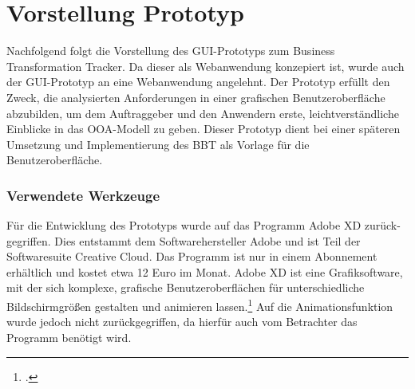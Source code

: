\section{Vorstellung Prototyp}
Nachfolgend folgt die Vorstellung des GUI-Prototyps zum Business Transformation Tracker. Da dieser als Webanwendung konzepiert ist, wurde auch der GUI-Prototyp an eine Webanwendung angelehnt. Der Prototyp erfüllt den Zweck, die analysierten Anforderungen in einer grafischen Benutzeroberfläche abzubilden, um dem Auftraggeber und den Anwendern erste, leichtverständliche Einblicke in das OOA-Modell zu geben. Dieser Prototyp dient bei einer späteren Umsetzung und Implementierung des BBT als Vorlage für die Benutzeroberfläche.

\subsubsection{Verwendete Werkzeuge}
Für die Entwicklung des Prototyps wurde auf das Programm Adobe XD zurück-gegriffen. Dies entstammt dem Softwarehersteller Adobe und ist Teil der Softwaresuite \glqq{}Creative Cloud\grqq{}. Das Programm ist nur in einem Abonnement erhältlich und kostet etwa 12 Euro im Monat. Adobe XD ist eine Grafiksoftware, mit der sich komplexe, grafische Benutzeroberflächen für unterschiedliche Bildschirmgrößen gestalten und animieren lassen.\footcite[Vgl.][]{adobe} Auf die Animationsfunktion wurde jedoch nicht zurückgegriffen, da hierfür auch vom Betrachter das Programm benötigt wird.

